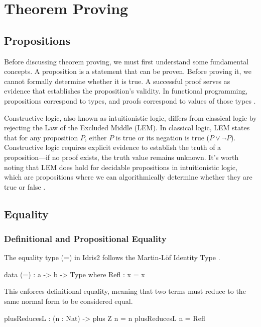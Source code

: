 \documentclass[]{rptuseminar}
\begin{document}
\section{Theorem Proving}
\label{sec:Proposition}

\subsection{Propositions}
Before discussing theorem proving, we must first understand some fundamental concepts. A proposition is a statement that can be proven. Before proving it, we cannot formally determine whether it is true. A successful proof serves as evidence that establishes the proposition's validity. In functional programming, propositions correspond to types, and proofs correspond to values of those types \cite{howard1980formulae}.

Constructive logic, also known as intuitionistic logic, differs from classical logic by rejecting the Law of the Excluded Middle (LEM). In classical logic, LEM states that for any proposition $P$, either $P$ is true or its negation is true ($P \lor \lnot P$). Constructive logic requires explicit evidence to establish the truth of a proposition—if no proof exists, the truth value remains unknown. It's worth noting that LEM does hold for decidable propositions in intuitionistic logic, which are propositions where we can algorithmically determine whether they are true or false \cite{dummett2000elements}.

\subsection{Equality}
\label{sec:Equality}

\subsubsection{Definitional and Propositional Equality}
The equality type (=) in Idris2 follows the Martin-Löf Identity Type \cite{martin1984intuitionistic}.

\begin{idris}
data (=) : a -> b -> Type where  
Refl : x = x
\end{idris}

This enforces definitional equality, meaning that two terms must reduce to the same normal form to be considered equal.

\begin{idris}
plusReducesL : (n : Nat) -> plus Z n = n
plusReducesL n = Refl
\end{idris}
\end{document}
